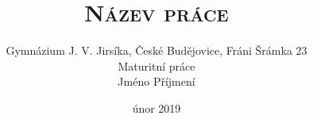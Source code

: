 \newcommand{\titletextstyle}[1]{{\normalfont\sffamily #1}}

\title{\titletextstyle{\scshape Název práce}}
\author{\titletextstyle{Gymnázium J. V. Jirsíka, České Budějovice, Fráni Šrámka 23}\\
	\titletextstyle{Maturitní práce}\\
	\titletextstyle{Jméno Příjmení}}
\date{\titletextstyle{únor 2019}}